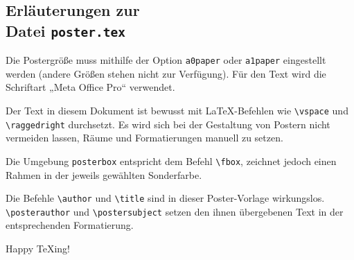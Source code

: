 \documentclass[a1paper]{article}
\begin{document}

\begin{posterbox}
	\vspace{-10mm}
	\raggedright

	\section*{Erläuterungen zur\\Datei \texttt{poster.tex}}
	Die Postergröße muss mithilfe der Option \verb+a0paper+ oder \verb+a1paper+ eingestellt werden (andere Größen stehen nicht zur Verfügung).
	Für den Text wird die Schriftart „Meta Office Pro“ verwendet.

	Der Text in diesem Dokument ist bewusst mit \LaTeX-Befehlen wie \verb+\vspace+ und \verb+\raggedright+ durchsetzt.
	Es wird sich bei der Gestaltung von Postern nicht vermeiden lassen, Räume und Formatierungen manuell zu setzen.

	Die Umgebung \verb+posterbox+ entspricht dem Befehl \verb+\fbox+, zeichnet jedoch einen Rahmen in der jeweils gewählten Sonderfarbe.

	Die Befehle \verb+\author+ und \verb+\title+ sind in dieser Poster-Vorlage wirkungslos.
	\verb+\posterauthor+ und \verb+\postersubject+ setzen den ihnen übergebenen Text in der entsprechenden Formatierung.

	\bigskip

	Happy \TeX{}ing!
\end{posterbox}

\vfill
\end{document}
